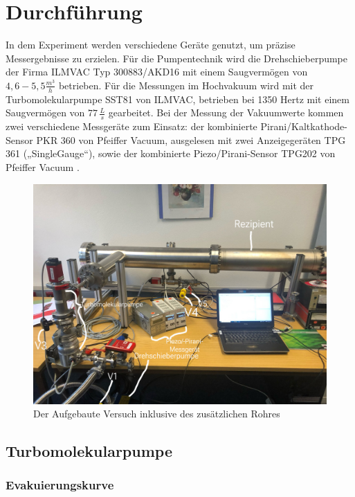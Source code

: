 \section{Durchführung}
\label{sec:Durchführung}

In dem Experiment werden verschiedene Geräte genutzt, um präzise Messergebnisse zu erzielen.
Für die Pumpentechnik wird die Drehschieberpumpe der Firma ILMVAC Typ 300883/AKD16 mit einem Saugvermögen von \(4,6-5,5 \frac{m^3}{h}\)
betrieben. Für die Messungen im Hochvakuum wird mit der Turbomolekularpumpe SST81 von ILMVAC, betrieben bei 1350 Hertz mit
einem Saugvermögen von \(77 \, \frac{L}{s}\) gearbeitet. Bei der Messung der Vakuumwerte kommen zwei verschiedene Messgeräte zum Einsatz:
der kombinierte Pirani/Kaltkathode-Sensor PKR 360 von Pfeiffer Vacuum, ausgelesen mit zwei Anzeigegeräten TPG 361 („SingleGauge“),
sowie der kombinierte Piezo/Pirani-Sensor TPG202 von Pfeiffer Vacuum
\cite{delta_tu_dortmund}.


\begin{figure}
    \includegraphics[width=\textwidth]{bilder/Aufbau.jpeg}
    \caption{Der Aufgebaute Versuch inklusive des zusätzlichen Rohres}
\end{figure}


\subsection{Turbomolekularpumpe}
\subsubsection{Evakuierungskurve}


